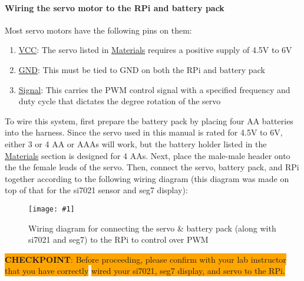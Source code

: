 \documentclass{article}
\newcommand{\imagefigb}[2]{
    \begin{figure}[H]
        \centering
        \texttt{[image: \#1]}
        \caption{#2}
    \end{figure}
}
\newcommand{\checkpoint}[2]{
    \newline \newline
    \noindent
    \colorbox{Orange}{\textbf{CHECKPOINT}: #1} \newline \colorbox{Orange}{#2}
    \newline \newline
}
\begin{document}
    \paragraph{Wiring the servo motor to the RPi and battery pack}
    Most servo motors have the following pins on them:
    \begin{enumerate}
      \item \underline{VCC}: The servo listed in \hyperref[sec:materials]{Materials} requires a positive supply of 4.5V to 6V
      \item \underline{GND}: This must be tied to GND on both the RPi and battery pack
      \item \underline{Signal}: This carries the PWM control signal with a specified frequency and duty cycle that dictates the degree rotation of the servo
    \end{enumerate}
    To wire this system, first prepare the battery pack by placing four AA batteries into the harness. Since the servo used in this manual is rated for 4.5V to 6V, either 3 or 4 AA or AAAs will work, but the battery holder listed in the \hyperref[sec:materials]{Materials} section is designed for 4 AAs.
    \newline
    \indent
    Next, place the male-male header onto the the female leads of the servo. Then, connect the servo, battery pack, and RPi together according to the following wiring diagram (this diagram was made on top of that for the si7021 sensor and seg7 display):
    \imagefigb{si7021-seg7-servo-wiring-diagram-v2.png}{Wiring diagram for connecting the servo \& battery pack (along with si7021 and seg7) to the RPi to control over PWM}
    \checkpoint{Before proceeding, please confirm with your lab instructor that you have correctly}{wired your si7021, seg7 display, and servo to the RPi.}
\end{document}
